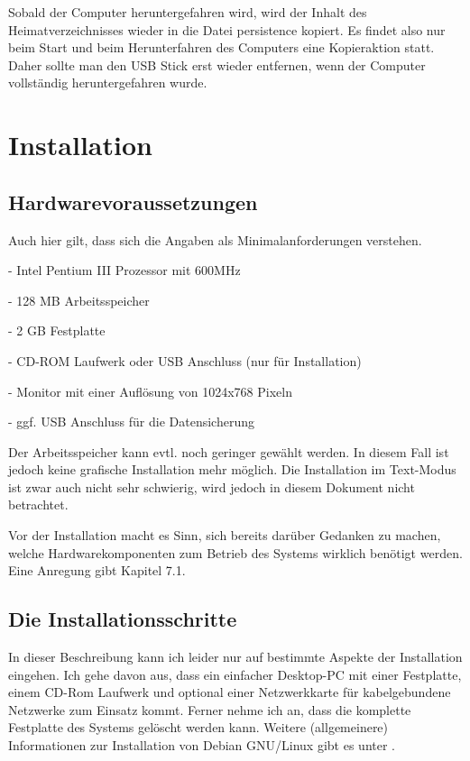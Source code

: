 \documentclass[a4paper,12pt,twoside]{article}
\begin{document}
Sobald der Computer heruntergefahren wird, wird der Inhalt des
Heimatverzeichnisses wieder in die Datei persistence kopiert. Es findet
also nur beim Start und beim Herunterfahren des Computers eine
Kopieraktion statt. Daher sollte man den USB Stick erst wieder
entfernen, wenn der Computer vollständig heruntergefahren wurde.


\bigskip

\section{Installation}
\subsection{Hardwarevoraussetzungen}
Auch hier gilt, dass sich die Angaben als Minimalanforderungen
verstehen.


\bigskip

{}- Intel Pentium III Prozessor mit 600MHz

{}- 128 MB Arbeitsspeicher

{}- 2 GB Festplatte

{}- CD-ROM Laufwerk oder USB Anschluss (nur für Installation)

{}- Monitor mit einer Auflösung von 1024x768 Pixeln

{}- ggf. USB Anschluss für die Datensicherung


\bigskip

Der Arbeitsspeicher kann evtl. noch geringer gewählt werden. In diesem
Fall ist jedoch keine grafische Installation mehr möglich. Die
Installation im Text-Modus ist zwar auch nicht sehr schwierig, wird
jedoch in diesem Dokument nicht betrachtet.

Vor der Installation macht es Sinn, sich bereits darüber Gedanken zu
machen, welche Hardwarekomponenten zum Betrieb des Systems wirklich
benötigt werden. Eine Anregung gibt Kapitel 7.1.


\bigskip

\subsection{Die Installationsschritte}
In dieser Beschreibung kann ich leider nur auf bestimmte Aspekte der
Installation eingehen. Ich gehe davon aus, dass ein einfacher
Desktop-PC mit einer Festplatte, einem CD-Rom Laufwerk und optional
einer Netzwerkkarte für kabelgebundene Netzwerke zum Einsatz kommt.
Ferner nehme ich an, dass die komplette Festplatte des Systems gelöscht
werden kann. Weitere (allgemeinere) Informationen zur Installation von
Debian GNU/Linux gibt es unter \cite{DEB2}.
\end{document}

